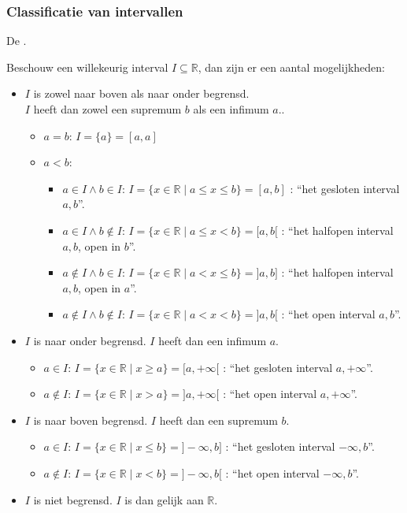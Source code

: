 \documentclass[main.tex]{subfiles}
\begin{document}
\subsubsection{Classificatie van intervallen}
\label{sec:class-van-interv}

\begin{st}
  De .

  Beschouw een willekeurig interval $I \subseteq \mathbb{R}$, dan zijn er een aantal mogelijkheden:
  \begin{itemize}
  \item $I$ is zowel naar boven als naar onder begrensd.\\
    $I$ heeft dan zowel een supremum $b$ als een infimum $a$..
    \begin{itemize}
    \item $a=b$: $I=\{a\} = [a,a]$
    \item $a<b$: 
      \begin{itemize}
      \item $a\in I \wedge b\in I$: $I = \{ x\in \mathbb{R} \mid a\le x \le b\} = [a,b]$ : ``het gesloten interval $a,b$''.
      \item $a\in I \wedge b\not\in I$: $I = \{ x\in \mathbb{R} \mid a\le x < b\} = [a,b[$ : ``het halfopen interval $a,b$, open in $b$''.
      \item $a\not\in I \wedge b\in I$: $I = \{ x\in \mathbb{R} \mid a< x \le b\} = ]a,b]$ : ``het halfopen interval $a,b$, open in $a$''.
      \item $a\not\in I \wedge b\not\in I$: $I = \{ x\in \mathbb{R} \mid a< x < b\} = ]a,b[$ : ``het open interval $a,b$''.
      \end{itemize}
    \end{itemize}
  \item $I$ is naar onder begrensd.
    $I$ heeft dan een infimum $a$.
    \begin{itemize}
    \item $a\in I$: $I = \{ x\in \mathbb{R} \mid x \ge a\} = [a,+\infty[$ : ``het gesloten interval $a, +\infty$''.
    \item $a\not\in I$: $I = \{ x\in \mathbb{R} \mid x > a\} = ]a,+\infty[$ : ``het open interval $a, +\infty$''.
    \end{itemize}
  \item $I$ is naar boven begrensd.
    $I$ heeft dan een supremum $b$.
    \begin{itemize}
    \item $a\in I$: $I = \{ x\in \mathbb{R} \mid x \le b \} = ]-\infty,b]$ : ``het gesloten interval $-\infty, b$''.
    \item $a\not\in I$: $I = \{ x\in \mathbb{R} \mid x < b \} = ]-\infty,b[$ : ``het open interval $-\infty,b$''. 
    \end{itemize}
  \item $I$ is niet begrensd. $I$ is dan gelijk aan $\mathbb{R}$.
  \end{itemize}
  \zb
\end{st}
\end{document}

